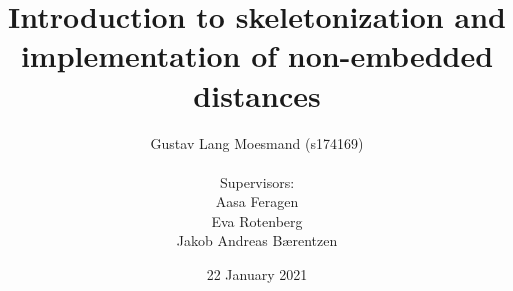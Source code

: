 \usepackage[utf8]{inputenc}
\usepackage{fancyhdr}
\usepackage{amsmath}
\usepackage{amsfonts}
\usepackage{amssymb}
\usepackage[left=2cm,right=2cm,top=2cm,bottom=2cm]{geometry}
\usepackage{mathtools}
\usepackage{qtree}
\usepackage{subfiles}
\usepackage{hyperref}
\usepackage{titlesec}
\usepackage{tocloft}

\usepackage{titlepic}
\usepackage{enumitem}
\usepackage{lastpage}
\usepackage{lipsum}
\usepackage{listings}
\usepackage{color}
\usepackage{caption}
\usepackage{subcaption}
\usepackage[font=small]{caption, subcaption}
\usepackage{float}





\newcommand{\lr}[1]{\left\{ #1 \right\}}
\newcommand{\bs}[1]{\boldsymbol{ #1 }}

\title{Introduction to skeletonization and implementation of non-embedded distances}
\author{
    Gustav Lang Moesmand (s174169)\\\\
    Supervisors:\\
    Aasa Feragen\\
    Eva Rotenberg\\
    Jakob Andreas Bærentzen
}

\date{
    22 January 2021
}


\renewcommand{\cftsecnumwidth}{1em}

\renewcommand{\theequation}{\arabic{equation}}

